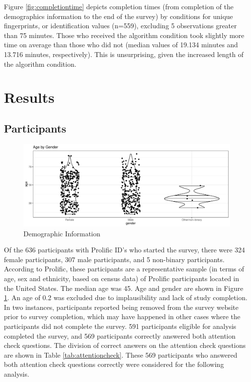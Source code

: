 \documentclass[print]{nuthesis}
\begin{document}
Figure \ref{fig:completiontime} depicts completion times (from completion of the demographics information to the end of the survey) by conditions for unique fingerprints, or identification values (n=559), excluding 5 observations greater than 75 minutes.
Those who received the algorithm condition took slightly more time on average than those who did not (median values of 19.134 minutes and 13.716 minutes, respectively). This is unsurprising, given the increased length of the algorithm condition.

\hypertarget{results}{%
\section{Results}\label{results}}

\hypertarget{participants}{%
\subsection{Participants}\label{participants}}

\begin{figure}

{\centering \includegraphics[width=\linewidth]{thesis_files/figure-latex/demographics-1} 

}

\caption{Demographic Information}\label{fig:demographics}
\end{figure}

Of the 636 participants with Prolific ID's who started the survey, there were 324 female participants, 307 male participants, and 5 non-binary participants.
According to Prolific, these participants are a representative sample (in terms of age, sex and ethnicity, based on census data) of Prolific participants located in the United States.
The median age was 45.
Age and gender are shown in Figure \ref{fig:demographics}.
An age of 0.2 was excluded due to implausibility and lack of study completion.
In two instances, participants reported being removed from the survey website prior to survey completion, which may have happened in other cases where the participants did not complete the survey.
591 participants eligible for analysis completed the survey, and 569 participants correctly answered both attention check questions.
The division of correct answers on the attention check questions are shown in Table \ref{tab:attentioncheck}.
These 569 participants who answered both attention check questions correctly were considered for the following analysis.
\end{document}
